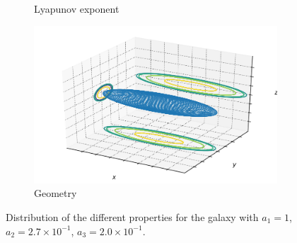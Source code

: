 \begin{figure}[h]
\begin{subfigure}[t]{0.4\textwidth}
        \caption{Lyapunov exponent}
    \end{subfigure}
    \begin{subfigure}[t]{0.4\textwidth}
        \includegraphics[width=\textwidth]{"../Files/Week 13/images/6_ellipsoid"}
        \caption{Geometry}
    \end{subfigure}
    \caption{Distribution of the different properties for the galaxy with $a_1 = 1$, $a_2 = 2.7\times10^{-1}$, $a_3 = 2.0\times10^{-1}$.}
\end{figure}


